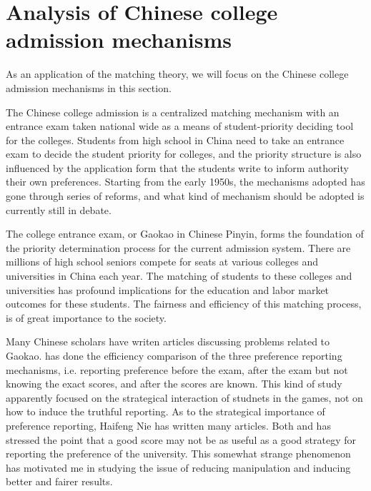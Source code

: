 



\section{Analysis of Chinese college admission mechanisms}

As an application of the matching theory, we will focus
on the Chinese college admission mechanisms in this section.

The Chinese college admission is a centralized matching mechanism with
an entrance exam taken national wide as a means of student-priority
deciding tool for the colleges.
Students from high school in China need to take an entrance exam to
decide the student priority for colleges, and the priority structure
is also influenced by the application form that the students write to
inform authority their own preferences. Starting from the early 1950s,
the mechanisms adopted has gone
through series of reforms,  and what kind of mechanism should be adopted is
currently still in debate.

The college entrance exam, or Gaokao in Chinese Pinyin,  forms the 
foundation of the priority determination process for the current
admission system.  There are millions of high school seniors compete
for  seats at various colleges and universities in China each
year. The matching of students to these colleges and universities has
profound implications for the education and labor market outcomes for
these students.  The fairness and efficiency of this matching process,
is of great importance to the society.

Many Chinese scholars have writen articles discussing problems related
to Gaokao. \parencite{Zhong2004} has done the efficiency comparison of
the three preference reporting  mechanisms, i.e. reporting preference
before the exam, after the exam but not knowing the exact scores,  and
after the scores are known.  This kind of study apparently focused on the
strategical interaction of studnets in the games, not on how to induce
the truthful reporting.  As to the strategical importance of
preference reporting,  Haifeng Nie has written many articles.  Both \parencite{Nie2007a}
and \parencite{Nie2007b} has stressed the point that a good score may
not be as useful as a good strategy for reporting the preference of
the university. This somewhat strange phenomenon has motivated me
in studying the issue of reducing manipulation and inducing better
and fairer results.

